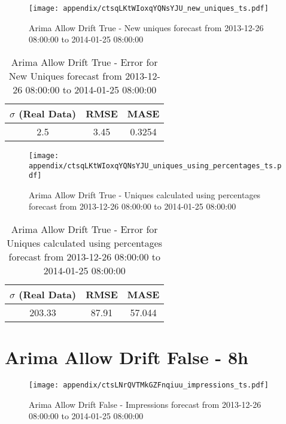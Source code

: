\begin{figure}[H] \begin{center} \leavevmode
\texttt{[image: appendix/ctsqLKtWIoxqYQNsYJU\_new\_uniques\_ts.pdf]} \caption{
Arima Allow Drift True - New uniques forecast from 2013-12-26 08:00:00 to 2014-01-25 08:00:00} \label{fig:appendix/ctsqLKtWIoxqYQNsYJU_new_uniques_ts.pdf} \end{center}
\end{figure}

\begin{table}[H]
\centering
\footnotesize
\begin{tabular}{ccc}
$\sigma$ (Real Data) & RMSE & MASE   \\ \hline
2.5 & 3.45 & 0.3254 \\
\end{tabular}

\vspace{0.5cm}

\caption{
Arima Allow Drift True - Error for New Uniques forecast from 2013-12-26 08:00:00 to 2014-01-25 08:00:00}
\end{table}

\begin{figure}[H] \begin{center} \leavevmode
\texttt{[image: appendix/ctsqLKtWIoxqYQNsYJU\_uniques\_using\_percentages\_ts.pdf]} \caption{
Arima Allow Drift True - Uniques calculated using percentages forecast from 2013-12-26 08:00:00 to 2014-01-25 08:00:00} \label{fig:appendix/ctsqLKtWIoxqYQNsYJU_uniques_using_percentages_ts.pdf} \end{center}
\end{figure}

\begin{table}[H]
\centering
\footnotesize
\begin{tabular}{ccc}
$\sigma$ (Real Data) & RMSE & MASE   \\ \hline
203.33 & 87.91 & 57.044 \\
\end{tabular}

\vspace{0.5cm}

\caption{
Arima Allow Drift True - Error for Uniques calculated using percentages forecast from 2013-12-26 08:00:00 to 2014-01-25 08:00:00}
\end{table}

\section{Arima Allow Drift False - 8h}
\begin{figure}[H] \begin{center} \leavevmode
\texttt{[image: appendix/ctsLNrQVTMkGZFnqiuu\_impressions\_ts.pdf]} \caption{
Arima Allow Drift False - Impressions forecast from 2013-12-26 08:00:00 to 2014-01-25 08:00:00} \label{fig:appendix/ctsLNrQVTMkGZFnqiuu_impressions_ts.pdf} \end{center}
\end{figure}

